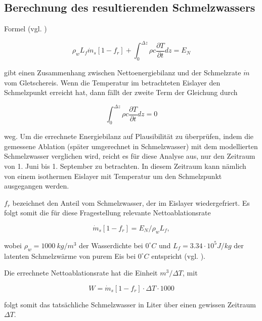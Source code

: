 \documentclass[11pt,a4paper]{article}
\begin{document}
\subsection{Berechnung des resultierenden Schmelzwassers}\label{Section Berechnung Schmelzwasser}
Formel (vgl. \cite[142]{ThePhysicsOfGlaciers})

\begin{equation}
\rho_{w} L_{f} \dot{m}_{s}\left[1-f_{r}\right]+\int_{0}^{\Delta z} \rho c \frac{\partial T}{\partial t} d z=E_{N}
\end{equation}


gibt einen Zusammenhang zwischen Nettoenergiebilanz und der Schmelzrate $\dot{m}$ vom Gletschereis. Wenn die Temperatur im betrachteten Eislayer den Schmelzpunkt erreicht hat, dann fällt der zweite Term der Gleichung durch


\begin{equation}
\int_{0}^{\Delta z} \rho c \frac{\partial T}{\partial t} d z=0
\end{equation}

weg. Um die errechnete Energiebilanz auf Plausibilität zu überprüfen, indem die gemessene Ablation (später umgerechnet in Schmelzwasser) mit dem modellierten Schmelzwasser verglichen wird, reicht es für diese Analyse aus, nur den Zeitraum von 1. Juni bis 1. September zu betrachten. In diesem Zeitraum kann nämlich von einem isothermen Eislayer mit Temperatur um den Schmelzpunkt ausgegangen werden.

$f_r$ bezeichnet den Anteil vom Schmelzwasser, der im Eislayer wiedergefriert. Es folgt somit die für diese Fragestellung relevante Nettoablationsrate 

\begin{equation}
\dot{m}_{s}\left[1-f_{r}\right]=E_{N} / \rho_{w} L_{f},
\end{equation}

wobei $\rho_{w}=1000~kg/m^{3}$ der Wasserdichte bei $0^\circ C$ und $L_{f}=3.34 \cdot 10^5 J/kg$ der latenten Schmelzwärme von purem Eis bei $0^\circ C$ entspricht (vgl. \cite[142]{ThePhysicsOfGlaciers}).

Die errechnete Nettoablationsrate hat die Einheit $m^3/\Delta T$, mit

\begin{equation}
W = \dot{m}_{s}\left[1-f_{r}\right] \cdot \Delta T \cdot 1000
\end{equation}


folgt somit das tatsächliche Schmelzwasser in Liter über einen gewissen Zeitraum $\Delta T$.
\end{document}
